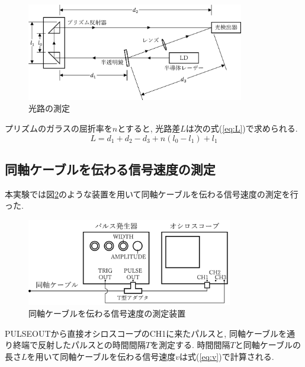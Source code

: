 \documentclass{jarticle}
\begin{document}
\begin{figure}[H]
  \begin{center}
    \includegraphics[width=95mm]{experimental_distance_picture.png}
    \caption{光路の測定}
    \label{fg:lightspeed-distance}
  \end{center}
\end{figure}

プリズムのガラスの屈折率を$n$とすると, 光路差$L$は次の式(\ref{eq:L})で求められる.
\begin{equation}
  L=d_1+d_2-d_3+n(l_0-l_1)+l_1
  \label{eq:L}
\end{equation}


\subsection{同軸ケーブルを伝わる信号速度の測定}

本実験では図\ref{fg:cable-method}のような装置を用いて同軸ケーブルを伝わる信号速度の測定を行った.

\begin{figure}[H]
  \begin{center}
    \includegraphics[width=90mm]{experimental_method_cable_picture.png}
    \caption{同軸ケーブルを伝わる信号速度の測定装置}
    \label{fg:cable-method}
  \end{center}
\end{figure}

PULSEOUTから直接オシロスコープのCH1に来たパルスと, 同軸ケーブルを通り終端で反射したパルスとの時間間隔$T$を測定する.
時間間隔$T$と同軸ケーブルの長さ$L$を用いて同軸ケーブルを伝わる信号速度$v$は式(\ref{eq:v})で計算される.
\end{document}
